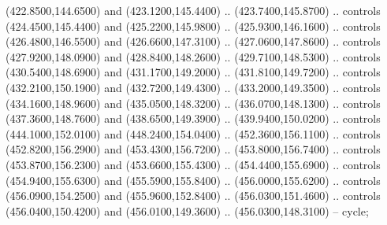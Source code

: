 {\begin{scope}[y=0.80pt, x=0.80pt, yscale=-1, xscale=1, inner sep=0pt, outer sep=0pt, #1]
      (422.8500,144.6500) and (423.1200,145.4400) .. (423.7400,145.8700) .. controls
      (424.4500,145.4400) and (425.2200,145.9800) .. (425.9300,146.1600) .. controls
      (426.4800,146.5500) and (426.6600,147.3100) .. (427.0600,147.8600) .. controls
      (427.9200,148.0900) and (428.8400,148.2600) .. (429.7100,148.5300) .. controls
      (430.5400,148.6900) and (431.1700,149.2000) .. (431.8100,149.7200) .. controls
      (432.2100,150.1900) and (432.7200,149.4300) .. (433.2000,149.3500) .. controls
      (434.1600,148.9600) and (435.0500,148.3200) .. (436.0700,148.1300) .. controls
      (437.3600,148.7600) and (438.6500,149.3900) .. (439.9400,150.0200) .. controls
      (444.1000,152.0100) and (448.2400,154.0400) .. (452.3600,156.1100) .. controls
      (452.8200,156.2900) and (453.4300,156.7200) .. (453.8000,156.7400) .. controls
      (453.8700,156.2300) and (453.6600,155.4300) .. (454.4400,155.6900) .. controls
      (454.9400,155.6300) and (455.5900,155.8400) .. (456.0000,155.6200) .. controls
      (456.0900,154.2500) and (455.9600,152.8400) .. (456.0300,151.4600) .. controls
      (456.0400,150.4200) and (456.0100,149.3600) .. (456.0300,148.3100) -- cycle;


\end{scope}}
